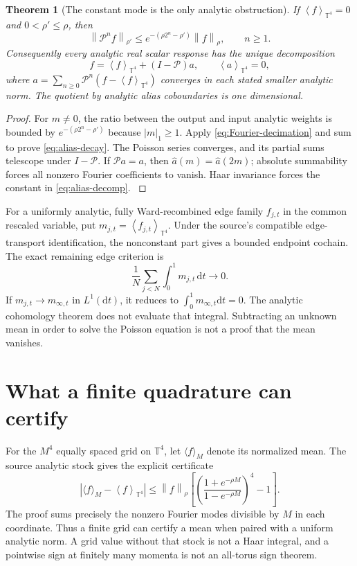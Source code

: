\documentclass[11pt,oneside,openany]{book}
\newtheorem{theorem}{Theorem}[chapter]
\theoremstyle{definition}
\theoremstyle{remark}
\newcommand{\T}{\mathbb T}
\newcommand{\dd}{\mathrm d}
\newcommand{\norm}[1]{\left\lVert#1\right\rVert}
\newcommand{\abs}[1]{\left\lvert#1\right\rvert}
\newcommand{\avg}[1]{\left\langle#1\right\rangle_{\T^4}}
\newcommand{\src}[2]{\cite[#2]{#1}}
\begin{document}
\begin{theorem}[The constant mode is the only analytic obstruction]\label{thm:alias}
If $\avg f=0$ and $0<\rho'\le\rho$, then
\begin{equation}\label{eq:alias-decay}
\norm{\mathcal P^nf}_{\rho'}
\le e^{-(\rho2^n-\rho')}\norm f_\rho,\qquad n\ge1.
\end{equation}
Consequently every analytic real scalar response has the unique decomposition
\begin{equation}\label{eq:alias-decomp}
f=\avg f+(I-\mathcal P)a,\qquad \avg a=0,
\end{equation}
where $a=\sum_{n\ge0}\mathcal P^n(f-\avg f)$ converges in each stated smaller analytic norm. The quotient by analytic alias coboundaries is one dimensional.
\end{theorem}
\begin{proof}
For $m\ne0$, the ratio between the output and input analytic weights is bounded by $e^{-(\rho2^n-\rho')}$ because $|m|_1\ge1$. Apply \cref{eq:Fourier-decimation} and sum to prove \cref{eq:alias-decay}. The Poisson series converges, and its partial sums telescope under $I-\mathcal P$. If $\mathcal Pa=a$, then $\widehat a(m)=\widehat a(2m)$; absolute summability forces all nonzero Fourier coefficients to vanish. Haar invariance forces the constant in \cref{eq:alias-decomp}. \src{F9}{V17}
\end{proof}

For a uniformly analytic, fully Ward-recombined edge family $f_{j,t}$ in the common rescaled variable, put $m_{j,t}=\avg{f_{j,t}}$. Under the source's compatible edge-transport identification, the nonconstant part gives a bounded endpoint cochain. The exact remaining edge criterion is
\begin{equation}\label{eq:edge-scalar}
\frac1N\sum_{j<N}\int_0^1m_{j,t}\,\dd t\longrightarrow0.
\end{equation}
If $m_{j,t}\to m_{\infty,t}$ in $L^1(\dd t)$, it reduces to $\int_0^1m_{\infty,t}\dd t=0$. The analytic cohomology theorem does not evaluate that integral. Subtracting an unknown mean in order to solve the Poisson equation is not a proof that the mean vanishes.

\section{What a finite quadrature can certify}
For the $M^4$ equally spaced grid on $\T^4$, let $\langle f\rangle_M$ denote its normalized mean. The source analytic stock gives the explicit certificate
\begin{equation}\label{eq:quadrature}
\abs{\langle f\rangle_M-\avg f}
\le\norm f_\rho
\left[\left(\frac{1+e^{-\rho M}}{1-e^{-\rho M}}\right)^4-1\right].
\end{equation}
The proof sums precisely the nonzero Fourier modes divisible by $M$ in each coordinate. Thus a finite grid can certify a mean when paired with a uniform analytic norm. A grid value without that stock is not a Haar integral, and a pointwise sign at finitely many momenta is not an all-torus sign theorem.
\end{document}
